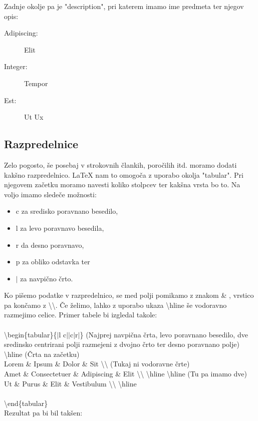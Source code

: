 \documentclass[a4paper]{book}
\newcommand\tbs{\textbackslash{}}
\begin{document}
Zadnje okolje pa je "description", pri katerem imamo ime predmeta ter njegov opis:
\begin{description}
\item[Adipiscing:] Elit
\item[Integer:] Tempor
\item[Est:] Ut Ux
\end{description}

\subsection{Razpredelnice}

Zelo pogosto, še posebaj v strokovnih člankih, poročilih itd. moramo dodati kakšno razpredelnico. \LaTeX{} nam to omogoča z uporabo okolja "tabular". 
Pri njegovem začetku moramo navesti koliko stolpcev ter kakšna vrsta bo to. Na voljo imamo sledeče možnosti:
\begin{itemize}
\item c za sredisko poravnano besedilo,
\item l za levo poravnavo besedila,
\item r da desno poravnavo,
\item p za obliko odstavka ter
\item $|$ za navpično črto.
\end{itemize}

Ko pišemo podatke v razpredelnico, se med polji pomikamo z znakom \& , vrstico pa končamo z \tbs\tbs. Če želimo, lahko z uporabo ukaza \tbs{}hline še vodoravno razmejimo celice.
Primer tabele bi izgledal takole:\\ \\
\tbs{}begin\{tabular\}\{$|$l c$||$c$|$r$|$\} (Najprej navpična črta, levo poravnano besedilo, dve sredinsko centrirani polji razmejeni z dvojno črto ter desno poravnano polje)\\
\tbs{}hline (Črta na začetku)\\
Lorem \& Ipsum \& Dolor \& Sit \tbs{}\tbs{} (Tukaj ni vodoravne črte)\\
Amet \& Consectetuer \& Adipiscing \& Elit \tbs{}\tbs{} \tbs{}hline \tbs{}hline (Tu pa imamo dve)\\
Ut \& Purus \& Elit \& Vestibulum \tbs{}\tbs{} \tbs{}hline\\\\
\tbs{}end\{tabular\}\\


Rezultat pa bi bil takšen:\\
\end{document}
